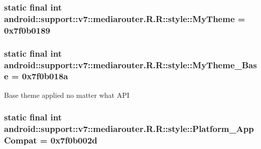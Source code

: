 \hypertarget{classandroid_1_1support_1_1v7_1_1mediarouter_1_1_r_1_1style_d49e9b88b4c84f3722c0021e4d29cd02}{
\subsubsection[{MyTheme}]{\setlength{\rightskip}{0pt plus 5cm}static final int android::support::v7::mediarouter.R.R::style::MyTheme = 0x7f0b0189}}
\label{classandroid_1_1support_1_1v7_1_1mediarouter_1_1_r_1_1style_d49e9b88b4c84f3722c0021e4d29cd02}


\hypertarget{classandroid_1_1support_1_1v7_1_1mediarouter_1_1_r_1_1style_b1b3ac93c8a26d3740c55f9022502b20}{
\subsubsection[{MyTheme\_\-Base}]{\setlength{\rightskip}{0pt plus 5cm}static final int android::support::v7::mediarouter.R.R::style::MyTheme\_\-Base = 0x7f0b018a}}
\label{classandroid_1_1support_1_1v7_1_1mediarouter_1_1_r_1_1style_b1b3ac93c8a26d3740c55f9022502b20}


Base theme applied no matter what API \hypertarget{classandroid_1_1support_1_1v7_1_1mediarouter_1_1_r_1_1style_e161bb190d506eb0a22ea1ac56c0b2c8}{
\subsubsection[{Platform\_\-AppCompat}]{\setlength{\rightskip}{0pt plus 5cm}static final int android::support::v7::mediarouter.R.R::style::Platform\_\-AppCompat = 0x7f0b002d}}
\label{classandroid_1_1support_1_1v7_1_1mediarouter_1_1_r_1_1style_e161bb190d506eb0a22ea1ac56c0b2c8}



